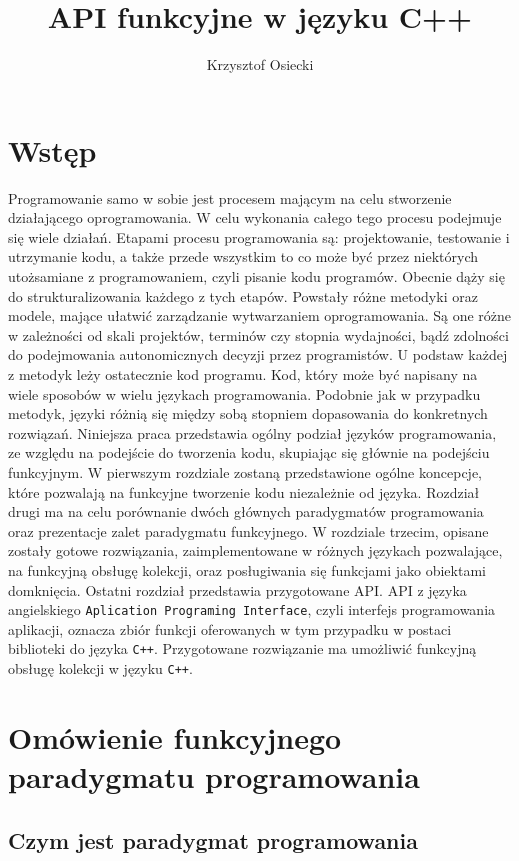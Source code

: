 \documentclass[a4paper,10pt]{report}
\title{API funkcyjne w języku C++}
\author{Krzysztof Osiecki}
\begin{document}
\pagestyle{fancy}\lhead{}\rightmark

\maketitle
\tableofcontents{}
\chapter*{Wstęp}
Programowanie samo w sobie jest procesem mającym na celu stworzenie działającego oprogramowania. W celu wykonania całego tego procesu podejmuje się wiele działań. Etapami procesu programowania są: projektowanie, testowanie i utrzymanie kodu, a także przede wszystkim to co może być przez niektórych utożsamiane z programowaniem, czyli pisanie kodu programów. Obecnie dąży się do strukturalizowania każdego z tych etapów. Powstały różne metodyki oraz modele, mające ułatwić zarządzanie wytwarzaniem oprogramowania. Są one różne w zależności od skali projektów, terminów czy stopnia wydajności, bądź zdolności do podejmowania autonomicznych decyzji przez programistów. U podstaw każdej z metodyk leży ostatecznie kod programu. Kod, który może być napisany na wiele sposobów w wielu językach programowania. Podobnie jak w przypadku metodyk, języki różnią się między sobą stopniem dopasowania do konkretnych rozwiązań. Niniejsza praca przedstawia ogólny podział języków programowania, ze względu na podejście do tworzenia kodu, skupiając się głównie na podejściu funkcyjnym. W pierwszym rozdziale zostaną przedstawione ogólne koncepcje, które pozwalają na funkcyjne tworzenie kodu niezależnie od języka. Rozdział drugi ma na celu porównanie dwóch głównych paradygmatów programowania oraz prezentacje zalet paradygmatu funkcyjnego. W rozdziale trzecim, opisane zostały gotowe rozwiązania, zaimplementowane w różnych językach pozwalające, na funkcyjną obsługę kolekcji, oraz posługiwania się funkcjami jako obiektami domknięcia. Ostatni rozdział przedstawia przygotowane API. API z języka angielskiego \verb|Aplication Programing Interface|, czyli interfejs programowania aplikacji, oznacza zbiór funkcji oferowanych w tym przypadku w postaci biblioteki do języka \verb|C++|. Przygotowane rozwiązanie ma umożliwić funkcyjną obsługę kolekcji w języku \verb|C++|. 
\chapter{Omówienie funkcyjnego paradygmatu programowania}
\section{Czym jest paradygmat programowania}
\end{document}
